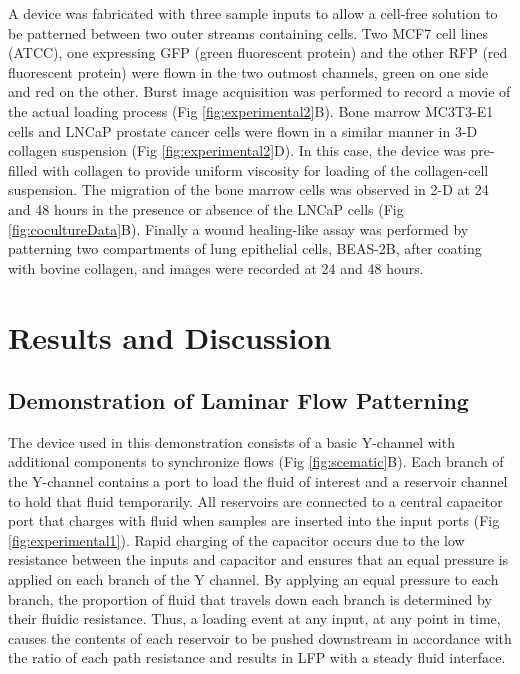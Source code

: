 A device was fabricated with three sample inputs to allow a cell-free solution to be patterned between two outer streams containing cells. Two MCF7 cell lines (ATCC), one expressing GFP (green fluorescent protein) and the other RFP (red fluorescent protein) were flown in the two outmost channels, green on one side and red on the other. Burst image acquisition was performed to record a movie of the actual loading process (Fig \ref{fig:experimental2}B). Bone marrow MC3T3-E1 cells and LNCaP prostate cancer cells were flown in a similar manner in 3-D collagen suspension (Fig \ref{fig:experimental2}D). In this case, the device was pre-filled with collagen to provide uniform viscosity for loading of the collagen-cell suspension. The migration of the bone marrow cells was observed in 2-D at 24 and 48 hours in the presence or absence of the LNCaP cells (Fig \ref{fig:cocultureData}B). Finally a wound healing-like assay was performed by patterning two compartments of lung epithelial cells, BEAS-2B, after coating with bovine collagen, and images were recorded at 24 and 48 hours.


\section{Results and Discussion}

\subsection{Demonstration of Laminar Flow Patterning}

The device used in this demonstration consists of a basic Y-channel with additional components to synchronize flows (Fig \ref{fig:scematic}B). Each branch of the Y-channel contains a port to load the fluid of interest and a reservoir channel to hold that fluid temporarily. All reservoirs are connected to a central capacitor port that charges with fluid when samples are inserted into the input ports (Fig \ref{fig:experimental1}). Rapid charging of the capacitor occurs due to the low resistance between the inputs and capacitor and ensures that an equal pressure is applied on each branch of the Y channel. By applying an equal pressure to each branch, the proportion of fluid that travels down each branch is determined by their fluidic resistance. Thus, a loading event at any input, at any point in time, causes the contents of each reservoir to be pushed downstream in accordance with the ratio of each path resistance and results in LFP with a steady fluid interface.

